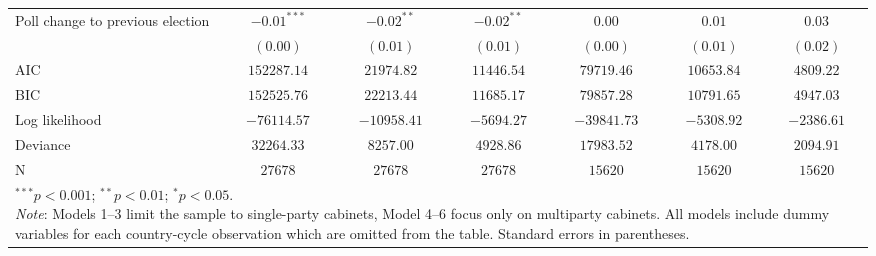 \documentclass[12pt,letterpaper]{article}
\begin{document}
\begin{table}[!h]
\begin{center}
\begin{scriptsize}
\begin{tabular}{l c c c c c c}
Poll change to previous election   & $-0.01^{***}$ & $-0.02^{**}$  & $-0.02^{**}$  & $0.00$        & $0.01$        & $0.03$        \\
                                   & $(0.00)$      & $(0.01)$      & $(0.01)$      & $(0.00)$      & $(0.01)$      & $(0.02)$      \\
\hline
AIC                                & $152287.14$   & $21974.82$    & $11446.54$    & $79719.46$    & $10653.84$    & $4809.22$     \\
BIC                                & $152525.76$   & $22213.44$    & $11685.17$    & $79857.28$    & $10791.65$    & $4947.03$     \\
Log likelihood                     & $-76114.57$   & $-10958.41$   & $-5694.27$    & $-39841.73$   & $-5308.92$    & $-2386.61$    \\
Deviance                           & $32264.33$    & $8257.00$     & $4928.86$     & $17983.52$    & $4178.00$     & $2094.91$     \\
N                                  & $27678$       & $27678$       & $27678$       & $15620$       & $15620$       & $15620$       \\
\hline
\multicolumn{7}{l}{\tiny{\parbox{.9\linewidth}{\footnotesize \vspace{2pt}$^{***}p<0.001$; $^{**}p<0.01$; $^{*}p<0.05$. \\
       \textit{Note}: Models 1--3  limit the sample to single-party cabinets, Model 4--6 focus only on multiparty cabinets.  
         All models include dummy variables for each country-cycle observation which are omitted from the table.
                      Standard errors in parentheses.}}}
\end{tabular}
\end{scriptsize}
\label{tab:reg_cycle}
\end{center}
\end{table}
\end{document}
